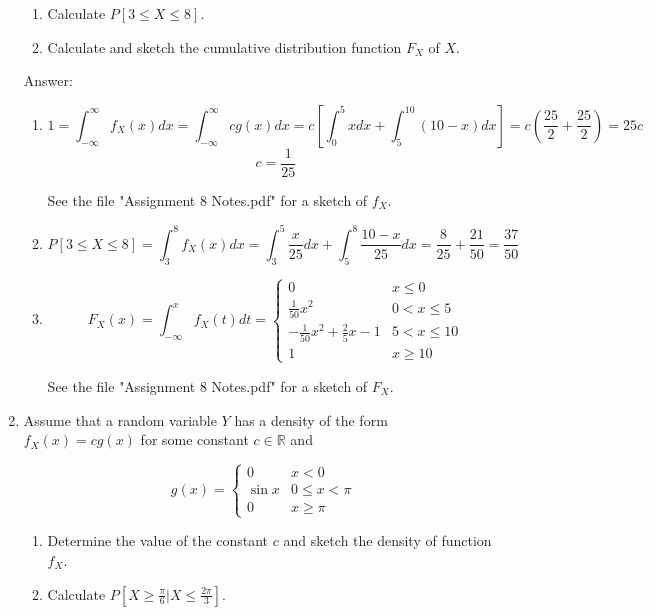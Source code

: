 \documentclass{article}
\begin{document}
\begin{enumerate}
\begin{enumerate}
\item
Calculate $P[3 \leq X \leq 8]$.

\item
Calculate and sketch the cumulative distribution function $F_X$ of $X$. 
\end{enumerate}

Answer:

\begin{enumerate}
\item
$$
1 = \int_{-\infty}^\infty f_X(x) dx = \int_{-\infty}^\infty cg(x) dx
= c\left[\int_0^5 x dx + \int_5^{10} (10-x) dx \right]
= c\left( \frac{25}{2} + \frac{25}{2} \right) = 25c
$$
$$
c = \boxed{\frac{1}{25}}
$$

See the file "Assignment 8 Notes.pdf" for a sketch of $f_X$. 

\item
$$
P[3 \leq X \leq 8] = \int_3^8 f_X(x) dx = \int_3^5 \frac{x}{25} dx + \int_5^8 \frac{10-x}{25} dx = \frac{8}{25} + \frac{21}{50} = \boxed{\frac{37}{50}}
$$

\item 
$$
F_X(x) = \int_{-\infty}^x f_X(t) dt =
\begin{cases}
0 & x \leq 0 \\
\frac{1}{50}x^2 & 0 < x \leq 5 \\
-\frac{1}{50}x^2 + \frac{2}{5}x - 1 & 5 < x \leq 10 \\
1 & x \geq 10
\end{cases}
$$

See the file "Assignment 8 Notes.pdf" for a sketch of $F_X$. 
\end{enumerate}

\newpage
\item

Assume that a random variable $Y$ has a density of the form $f_X(x) = cg(x)$ for some constant $c \in \mathbb{R}$ and 

$$
g(x) = \begin{cases}
0 & x < 0 \\
\sin x & 0 \leq x < \pi \\
0 & x \geq \pi
\end{cases}
$$

\begin{enumerate}
\item Determine the value of the constant $c$ and sketch the density of function $f_X$. 

\item Calculate $P[X \geq \frac{\pi}{6} \vert X \leq \frac{2\pi}{3}]$. 


\end{enumerate}
\end{enumerate}
\end{document}
